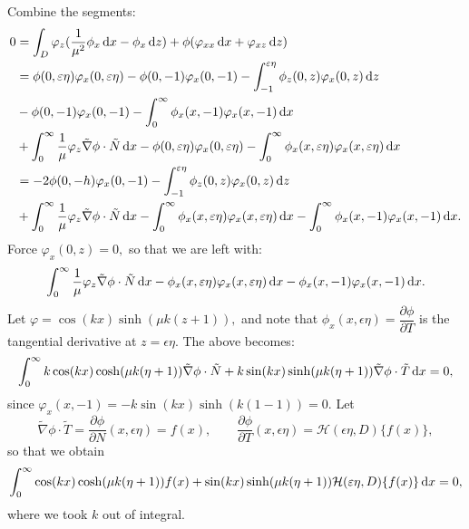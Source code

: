 \documentclass[10pt,reqno,oneside,a4paper]{article}
\begin{document}
Combine the segments:
\begin{align*}
0 &= \int_D \varphi_z(\frac{1}{\mu^2} \phi_x \,\mathrm{d} x - \phi_x \,\mathrm{d} z) + \phi(\varphi_{xx} \,\mathrm{d} x + \varphi_{xz} \,\mathrm{d} z) \\
&= \phi(0, \varepsilon \eta) \varphi_x(0, \varepsilon\eta) - \phi(0, -1) \varphi_x(0, -1) - \int_{-1}^{\varepsilon\eta} \phi_{z}(0,z) \varphi_{x}(0,z) \,\mathrm{d} z  \\
&- \phi(0,-1) \varphi_{x}(0,-1) - \int^{\infty}_{0} \phi_x(x,-1) \varphi_x(x,-1) \,\mathrm{d} x \\
&+\int_{0}^{\infty} \frac{1}{\mu} \varphi_z \tilde{\nabla} \phi \cdot \tilde{N} \,\mathrm{d} x - \phi(0, \varepsilon \eta) \varphi_x(0, \varepsilon\eta) - \int^{\infty}_{0}\phi_x(x, \varepsilon\eta)  \varphi_x(x, \varepsilon \eta) \,\mathrm{d} x\\
&= - 2\phi(0,-h) \varphi_{x}(0,-1) - \int_{-1}^{\varepsilon\eta} \phi_{z}(0,z) \varphi_{x}(0,z) \,\mathrm{d} z \\
& + \int_{0}^{\infty} \frac{1}{\mu} \varphi_z \tilde{\nabla} \phi \cdot \tilde{N} \,\mathrm{d} x - \int^{\infty}_{0}\phi_x(x, \varepsilon\eta) \varphi_x(x, \varepsilon \eta) \,\mathrm{d} x - \int^{\infty}_{0} \phi_x(x,-1) \varphi_x(x,-1) \,\mathrm{d} x.
\end{align*}
Force $\varphi_x(0,z) = 0,$ so that we are left with:
\begin{align*}
\int_{0}^{\infty} \frac{1}{\mu} \varphi_z \tilde{\nabla} \phi \cdot \tilde{N} \,\mathrm{d} x - \phi_x(x, \varepsilon\eta)  \varphi_x(x, \varepsilon \eta) \,\mathrm{d} x -  \phi_x(x,-1) \varphi_x(x,-1) \,\mathrm{d} x.
\end{align*}
Let $\varphi = \cos(kx) \sinh(\mu k(z+1)),$ and note that $\phi_x(x, \epsilon\eta) = \dfrac{\partial \phi}{\partial T}$ is the tangential derivative at $z = \epsilon\eta.$ The above becomes:
\begin{equation}
\int_{0}^{\infty} k \cos(kx) \cosh(\mu k(\eta+1)) \tilde{\nabla} \phi \cdot \tilde{N} + k \sin(kx) \sinh(\mu k(\eta+1)) \tilde{\nabla} \phi \cdot \tilde{T} \,\mathrm{d} x = 0,
\end{equation}
since $\varphi_x(x,-1) = -k \sin(kx) \sinh(k(1-1)) = 0.$ Let 
\[\tilde{\nabla} \phi \cdot \tilde{T} = \dfrac{\partial \phi}{\partial N}(x, \epsilon\eta) = f(x), \qquad \dfrac{\partial \phi}{\partial T}(x, \epsilon\eta) = \mathcal{H}(\epsilon\eta,D)\{ f(x) \}, \] 
so that we obtain
\begin{equation}\label{DimHLRP}
\int_{0}^{\infty} \cos(kx) \cosh(\mu k(\eta+1)) f(x) + \sin(kx) \sinh(\mu k(\eta+1))\mathcal{H}(\varepsilon \eta,D) \{f(x) \} \,\mathrm{d} x = 0,
\end{equation}
where we took $k$ out of integral.
\end{document}

